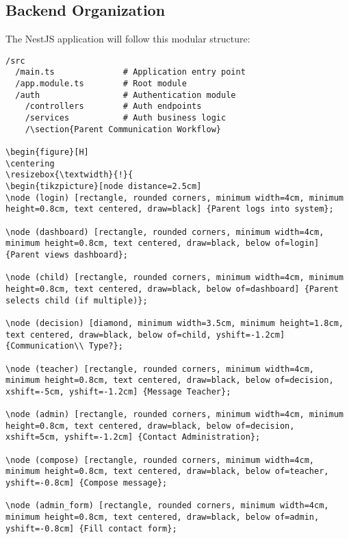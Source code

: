 \documentclass[11pt]{report}
\begin{document}
\subsection{Backend Organization}
The NestJS application will follow this modular structure:
\begin{verbatim}
/src
  /main.ts              # Application entry point
  /app.module.ts        # Root module
  /auth                 # Authentication module
    /controllers        # Auth endpoints
    /services           # Auth business logic
    /\section{Parent Communication Workflow}

\begin{figure}[H]
\centering
\resizebox{\textwidth}{!}{
\begin{tikzpicture}[node distance=2.5cm]
\node (login) [rectangle, rounded corners, minimum width=4cm, minimum height=0.8cm, text centered, draw=black] {Parent logs into system};

\node (dashboard) [rectangle, rounded corners, minimum width=4cm, minimum height=0.8cm, text centered, draw=black, below of=login] {Parent views dashboard};

\node (child) [rectangle, rounded corners, minimum width=4cm, minimum height=0.8cm, text centered, draw=black, below of=dashboard] {Parent selects child (if multiple)};

\node (decision) [diamond, minimum width=3.5cm, minimum height=1.8cm, text centered, draw=black, below of=child, yshift=-1.2cm] {Communication\\ Type?};

\node (teacher) [rectangle, rounded corners, minimum width=4cm, minimum height=0.8cm, text centered, draw=black, below of=decision, xshift=-5cm, yshift=-1.2cm] {Message Teacher};

\node (admin) [rectangle, rounded corners, minimum width=4cm, minimum height=0.8cm, text centered, draw=black, below of=decision, xshift=5cm, yshift=-1.2cm] {Contact Administration};

\node (compose) [rectangle, rounded corners, minimum width=4cm, minimum height=0.8cm, text centered, draw=black, below of=teacher, yshift=-0.8cm] {Compose message};

\node (admin_form) [rectangle, rounded corners, minimum width=4cm, minimum height=0.8cm, text centered, draw=black, below of=admin, yshift=-0.8cm] {Fill contact form};


\end{verbatim}
\end{document}
